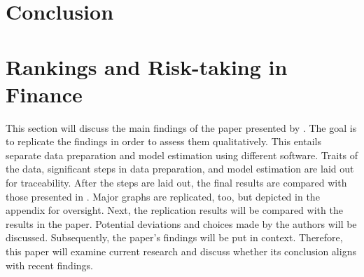 \documentclass[12pt]{article}
\begin{document}
\section{Conclusion} \label{section:Conclusion}




\section{Rankings and Risk-taking in Finance} \label{section:rankings}
This section will discuss the main findings of the paper presented by \textcite{Kirchler2018}. The goal is to replicate the findings in order to assess them qualitatively. This entails separate data preparation and model estimation using different software.
Traits of the data, significant steps in data preparation, and model estimation are laid out for traceability. After the steps are laid out, the final results are compared with those presented in \textcite{Kirchler2018}. Major graphs are replicated, too, but depicted in the appendix for oversight.
Next, the replication results will be compared with the results in the paper. Potential deviations and choices made by the authors will be discussed. Subsequently, the paper's findings will be put in context. Therefore, this paper will examine current research and discuss whether its conclusion aligns with recent findings.
\end{document}
